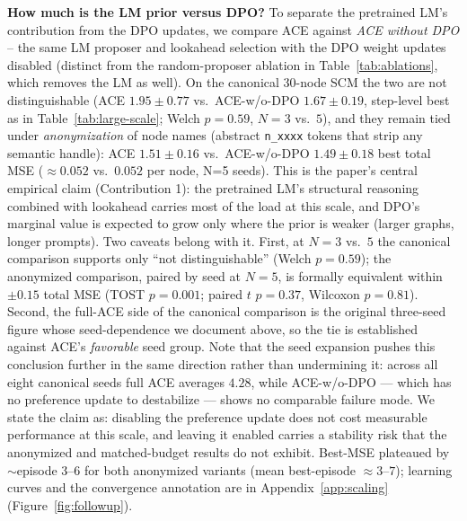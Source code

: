 \documentclass{article}
\theoremstyle{plain}
\theoremstyle{definition}
\theoremstyle{remark}
\begin{document}
\textbf{How much is the LM prior versus DPO?} To separate the pretrained LM's contribution from the DPO updates, we compare ACE against \emph{ACE without DPO} -- the same LM proposer and lookahead selection with the DPO weight updates disabled (distinct from the random-proposer ablation in Table~\ref{tab:ablations}, which removes the LM as well). On the canonical 30-node SCM the two are not distinguishable (ACE $1.95\pm0.77$ vs.\ ACE-w/o-DPO $1.67\pm0.19$, step-level best as in Table~\ref{tab:large-scale}; Welch $p=0.59$, $N{=}3$ vs.\ $5$), and they remain tied under \emph{anonymization} of node names (abstract \texttt{n\_xxxx} tokens that strip any semantic handle): ACE $1.51\pm0.16$ vs.\ ACE-w/o-DPO $1.49\pm0.18$ best total MSE ($\approx\!0.052$ vs.\ $0.052$ per node, N=5 seeds). This is the paper's central empirical claim (Contribution 1): the pretrained LM's structural reasoning combined with lookahead carries most of the load at this scale, and DPO's marginal value is expected to grow only where the prior is weaker (larger graphs, longer prompts). Two caveats belong with it. First, at $N{=}3$ vs.\ $5$ the canonical comparison supports only ``not distinguishable'' (Welch $p=0.59$); the anonymized comparison, paired by seed at $N{=}5$, is formally equivalent within $\pm0.15$ total MSE (TOST $p=0.001$; paired $t$ $p=0.37$, Wilcoxon $p=0.81$). Second, the full-ACE side of the canonical comparison is the original three-seed figure whose seed-dependence we document above, so the tie is established against ACE's \emph{favorable} seed group. Note that the seed expansion pushes this conclusion further in the same direction rather than undermining it: across all eight canonical seeds full ACE averages $4.28$, while ACE-w/o-DPO --- which has no preference update to destabilize --- shows no comparable failure mode. We state the claim as: disabling the preference update does not cost measurable performance at this scale, and leaving it enabled carries a stability risk that the anonymized and matched-budget results do not exhibit. Best-MSE plateaued by $\sim$episode 3--6 for both anonymized variants (mean best-episode $\approx\!3$--$7$); learning curves and the convergence annotation are in Appendix~\ref{app:scaling} (Figure~\ref{fig:followup}).
\end{document}
